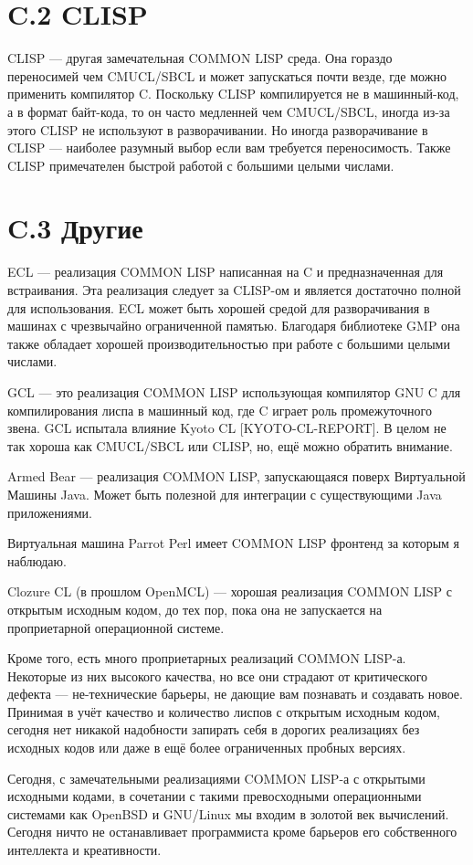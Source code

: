 \section*{C.2 CLISP}

CLISP --- другая замечательная COMMON LISP среда. Она гораздо переносимей чем CMUCL/SBCL и может запускаться почти везде, где можно применить компилятор C. Поскольку CLISP компилируется не в машинный-код, а в формат байт-кода, то он часто медленней чем CMUCL/SBCL, иногда из-за этого CLISP не используют в разворачивании. Но иногда разворачивание в CLISP --- наиболее разумный выбор если вам требуется переносимость. Также CLISP примечателен быстрой работой с большими целыми числами.

\section*{C.3 Другие}

ECL --- реализация COMMON LISP написанная на C и предназначенная для встраивания. Эта реализация следует за CLISP-ом и является достаточно полной для использования. ECL может быть хорошей средой для разворачивания в машинах с чрезвычайно ограниченной памятью. Благодаря библиотеке GMP она также обладает хорошей производительностью при работе с большими целыми числами.

GCL --- это реализация COMMON LISP использующая компилятор GNU C для компилирования лиспа в машинный код, где C играет роль промежуточного звена. GCL испытала влияние Kyoto CL [KYOTO-CL-REPORT]. В целом не так хороша как CMUCL/SBCL или CLISP, но, ещё можно обратить внимание.

Armed Bear --- реализация COMMON LISP, запускающаяся поверх Виртуальной Машины Java. Может быть полезной для интеграции с существующими Java приложениями.

Виртуальная машина Parrot Perl имеет COMMON LISP фронтенд за которым я наблюдаю.

Clozure CL (в прошлом OpenMCL) --- хорошая реализация COMMON LISP с открытым исходным кодом, до тех пор, пока она не запускается на проприетарной операционной системе.

Кроме того, есть много проприетарных реализаций COMMON LISP-а. Некоторые из них высокого качества, но все они страдают от критического дефекта --- не-технические барьеры, не дающие вам познавать и создавать новое. Принимая в учёт качество и количество лиспов с открытым исходным кодом, сегодня нет никакой надобности запирать себя в дорогих реализациях без исходных кодов или даже в ещё более ограниченных пробных версиях.

Сегодня, с замечательными реализациями COMMON LISP-а с открытыми исходными кодами, в сочетании с такими превосходными операционными системами как OpenBSD и GNU/Linux мы входим в золотой век вычислений. Сегодня ничто не останавливает программиста кроме барьеров его собственного интеллекта и креативности.
